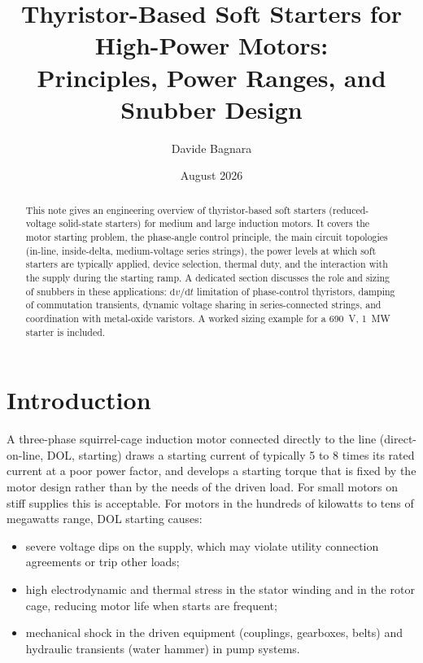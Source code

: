 \documentclass[11pt,a4paper]{article}
\title{Thyristor-Based Soft Starters for High-Power Motors:\\
Principles, Power Ranges, and Snubber Design}
\author{Davide Bagnara}
\date{August 2026}
\begin{document}
\maketitle

\begin{abstract}
This note gives an engineering overview of thyristor-based soft starters
(reduced-voltage solid-state starters) for medium and large induction motors.
It covers the motor starting problem, the phase-angle control principle,
the main circuit topologies (in-line, inside-delta, medium-voltage series
strings), the power levels at which soft starters are typically applied,
device selection, thermal duty, and the interaction with the supply during
the starting ramp. A dedicated section discusses the role and sizing of
snubbers in these applications: $\mathrm{d}v/\mathrm{d}t$ limitation of
phase-control thyristors, damping of commutation transients, dynamic voltage
sharing in series-connected strings, and coordination with metal-oxide
varistors. A worked sizing example for a \SI{690}{\volt}, \SI{1}{\mega\watt}
starter is included.
\end{abstract}

\tableofcontents

\section{Introduction}

A three-phase squirrel-cage induction motor connected directly to the line
(direct-on-line, DOL, starting) draws a starting current of typically 5 to 8
times its rated current at a poor power factor, and develops a starting
torque that is fixed by the motor design rather than by the needs of the
driven load. For small motors on stiff supplies this is acceptable. For
motors in the hundreds of kilowatts to tens of megawatts range, DOL starting
causes:

\begin{itemize}
  \item severe voltage dips on the supply, which may violate utility
        connection agreements or trip other loads;
  \item high electrodynamic and thermal stress in the stator winding and in
        the rotor cage, reducing motor life when starts are frequent;
  \item mechanical shock in the driven equipment (couplings, gearboxes,
        belts) and hydraulic transients (water hammer) in pump systems.
\end{itemize}
\end{document}
